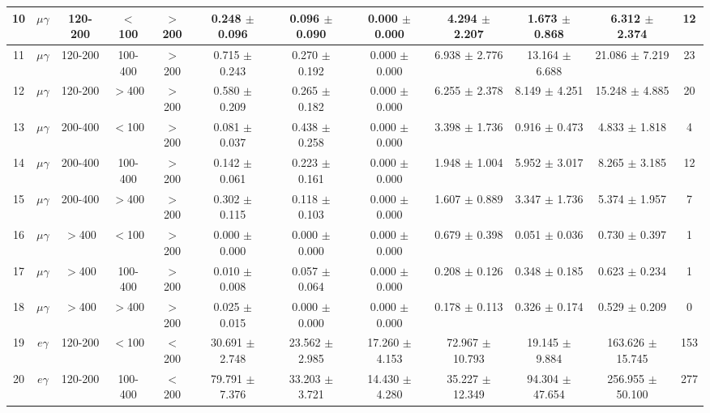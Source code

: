 \documentclass[thesis.tex]{subfiles}
\renewcommand\_{\textunderscore\allowbreak}
\begin{document}
\begin{table}[hbtp]
{\begin{tabular}{|c|c|c|c|c|c|c|c|c|c||c|c|}
 10&  $\mu\gamma$   & 120-200 & $<$100  & $>$200  &     0.248 $\pm$ 0.096  &   0.096 $\pm$ 0.090 &   0.000 $\pm$ 0.000  &   4.294 $\pm$  2.207 &   1.673 $\pm$  0.868 &   6.312 $\pm$   2.374  &  12\\ \hline
 11&  $\mu\gamma$   & 120-200 & 100-400 & $>$200  &     0.715 $\pm$ 0.243  &   0.270 $\pm$ 0.192 &   0.000 $\pm$ 0.000  &   6.938 $\pm$  2.776 &  13.164 $\pm$  6.688 &  21.086 $\pm$   7.219  &  23\\ \hline
 12&  $\mu\gamma$   & 120-200 & $>$400  & $>$200  &     0.580 $\pm$ 0.209  &   0.265 $\pm$ 0.182 &   0.000 $\pm$ 0.000  &   6.255 $\pm$  2.378 &   8.149 $\pm$  4.251 &  15.248 $\pm$   4.885  &  20\\ \hline
 13&  $\mu\gamma$   & 200-400 & $<$100  & $>$200  &     0.081 $\pm$ 0.037  &   0.438 $\pm$ 0.258 &   0.000 $\pm$ 0.000  &   3.398 $\pm$  1.736 &   0.916 $\pm$  0.473 &   4.833 $\pm$   1.818  &   4\\ \hline
 14&  $\mu\gamma$   & 200-400 & 100-400 & $>$200  &     0.142 $\pm$ 0.061  &   0.223 $\pm$ 0.161 &   0.000 $\pm$ 0.000  &   1.948 $\pm$  1.004 &   5.952 $\pm$  3.017 &   8.265 $\pm$   3.185  &  12\\ \hline
 15&  $\mu\gamma$   & 200-400 & $>$400  & $>$200  &     0.302 $\pm$ 0.115  &   0.118 $\pm$ 0.103 &   0.000 $\pm$ 0.000  &   1.607 $\pm$  0.889 &   3.347 $\pm$  1.736 &   5.374 $\pm$   1.957  &   7\\ \hline
 16&  $\mu\gamma$   & $>$400 & $<$100   & $>$200  &     0.000 $\pm$ 0.000  &   0.000 $\pm$ 0.000 &   0.000 $\pm$ 0.000  &   0.679 $\pm$  0.398 &   0.051 $\pm$  0.036 &   0.730 $\pm$   0.397  &   1\\ \hline
 17&  $\mu\gamma$   & $>$400 & 100-400  & $>$200  &     0.010 $\pm$ 0.008  &   0.057 $\pm$ 0.064 &   0.000 $\pm$ 0.000  &   0.208 $\pm$  0.126 &   0.348 $\pm$  0.185 &   0.623 $\pm$   0.234  &   1\\ \hline
 18&  $\mu\gamma$   & $>$400 & $>$400   & $>$200  &     0.025 $\pm$ 0.015  &   0.000 $\pm$ 0.000 &   0.000 $\pm$ 0.000  &   0.178 $\pm$  0.113 &   0.326 $\pm$  0.174 &   0.529 $\pm$   0.209  &   0\\ \hline
 \hline
 19&  $e\gamma$     & 120-200 & $<$100  & $<$200  &    30.691 $\pm$ 2.748  &  23.562 $\pm$ 2.985 &  17.260 $\pm$ 4.153  &  72.967 $\pm$ 10.793 &  19.145 $\pm$  9.884 & 163.626 $\pm$  15.745  & 153\\ \hline
 20&  $e\gamma$     & 120-200 & 100-400 & $<$200  &   79.791 $\pm$ 7.376  &  33.203 $\pm$ 3.721 &  14.430 $\pm$ 4.280  &  35.227 $\pm$ 12.349 &  94.304 $\pm$ 47.654 & 256.955 $\pm$  50.100  & 277\\ \hline

\end{tabular}}
\end{table}
\end{document}
